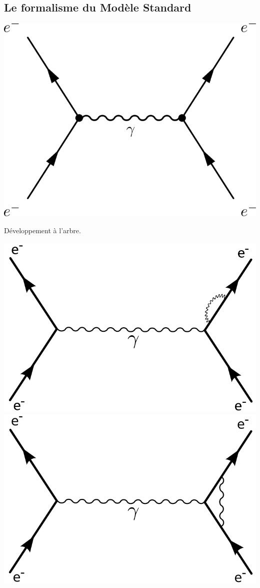\subsection{Le formalisme du Modèle Standard}
\marginpar
{
	\centering
	\includegraphics[width=\marginparwidth]{SM/feyn0.png}
	\captionsetup{type=subfigure}\caption{Développement à l'arbre.}
	\includegraphics[width=\marginparwidth]{SM/feyn1.png}
	\includegraphics[width=\marginparwidth]{SM/feyn2.png}
}
